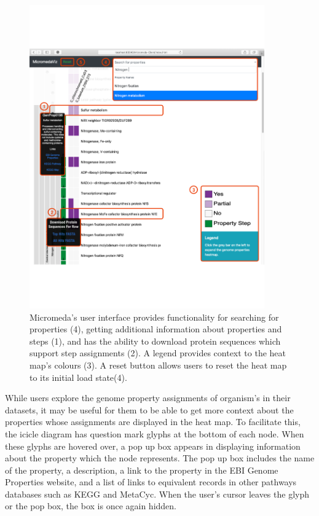 \begin{figure}[!ht]
  \centering
	\includegraphics[width=0.9\textwidth]{media/micromeda-interface.pdf}
	 \caption{Micromeda's user interface provides functionality for searching for properties (4), getting additional information about properties and steps (1), and has the ability to download protein sequences which support step assignments (2). A legend provides context to the heat map's colours (3). A reset button allows users to reset the heat map to its initial load state(4).}
	 \label{fig:micromeda-interface}
\end{figure}

While users explore the genome property assignments of organism's in their datasets, it may be useful for them to be able to get more context about the properties whose assignments are displayed in the heat map. To facilitate this, the icicle diagram has question mark glyphs at the bottom of each node. When these glyphs are hovered over, a pop up box appears in displaying information about the property which the node represents. The pop up box includes the name of the property, a description, a link to the property in the EBI Genome Properties website, and a list of links to equivalent records in other pathways databases such as KEGG and MetaCyc. When the user's cursor leaves the glyph or the pop box, the box is once again hidden.

